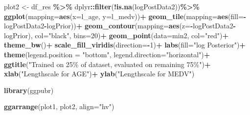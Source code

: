 \documentclass[
]{article}
\newenvironment{Shaded}{\begin{snugshade}}{\end{snugshade}}
\newcommand{\AttributeTok}[1]{\textcolor[rgb]{0.13,0.29,0.53}{#1}}
\newcommand{\DecValTok}[1]{\textcolor[rgb]{0.00,0.00,0.81}{#1}}
\newcommand{\FunctionTok}[1]{\textcolor[rgb]{0.13,0.29,0.53}{\textbf{#1}}}
\newcommand{\NormalTok}[1]{#1}
\newcommand{\OtherTok}[1]{\textcolor[rgb]{0.56,0.35,0.01}{#1}}
\newcommand{\SpecialCharTok}[1]{\textcolor[rgb]{0.81,0.36,0.00}{\textbf{#1}}}
\newcommand{\StringTok}[1]{\textcolor[rgb]{0.31,0.60,0.02}{#1}}
\begin{document}
\begin{Shaded}
\begin{Highlighting}[]
\NormalTok{plot2 }\OtherTok{\textless{}{-}}\NormalTok{ df\_res }\SpecialCharTok{\%\textgreater{}\%}
\NormalTok{  dplyr}\SpecialCharTok{::}\FunctionTok{filter}\NormalTok{(}\SpecialCharTok{!}\FunctionTok{is.na}\NormalTok{(logPostData2))}\SpecialCharTok{\%\textgreater{}\%}
  \FunctionTok{ggplot}\NormalTok{(}\AttributeTok{mapping=}\FunctionTok{aes}\NormalTok{(}\AttributeTok{x=}\NormalTok{l\_age, }\AttributeTok{y=}\NormalTok{l\_medv))}\SpecialCharTok{+}
  \FunctionTok{geom\_tile}\NormalTok{(}\AttributeTok{mapping=}\FunctionTok{aes}\NormalTok{(}\AttributeTok{fill=}\SpecialCharTok{{-}}\NormalTok{logPostData2}\SpecialCharTok{{-}}\NormalTok{logPrior))}\SpecialCharTok{+}
  \FunctionTok{geom\_contour}\NormalTok{(}\AttributeTok{mapping=}\FunctionTok{aes}\NormalTok{(}\AttributeTok{z=}\SpecialCharTok{{-}}\NormalTok{logPostData2}\SpecialCharTok{{-}}\NormalTok{logPrior), }\AttributeTok{col=}\StringTok{"black"}\NormalTok{, }\AttributeTok{bins=}\DecValTok{20}\NormalTok{)}\SpecialCharTok{+}
  \FunctionTok{geom\_point}\NormalTok{(}\AttributeTok{data=}\NormalTok{min2, }\AttributeTok{col=}\StringTok{"red"}\NormalTok{)}\SpecialCharTok{+}
  \FunctionTok{theme\_bw}\NormalTok{()}\SpecialCharTok{+}
  \FunctionTok{scale\_fill\_viridis}\NormalTok{(}\AttributeTok{direction=}\SpecialCharTok{{-}}\DecValTok{1}\NormalTok{)}\SpecialCharTok{+}
  \FunctionTok{labs}\NormalTok{(}\AttributeTok{fill=}\StringTok{"log Posterior"}\NormalTok{)}\SpecialCharTok{+}
  \FunctionTok{theme}\NormalTok{(}\AttributeTok{legend.position =} \StringTok{"bottom"}\NormalTok{,}
        \AttributeTok{legend.direction=}\StringTok{"horizontal"}\NormalTok{)}\SpecialCharTok{+}
  \FunctionTok{ggtitle}\NormalTok{(}\StringTok{"Trained on 25\% of dataset, evaluated on remaining 75\%"}\NormalTok{)}\SpecialCharTok{+}
  \FunctionTok{xlab}\NormalTok{(}\StringTok{"Lengthscale for \textquotesingle{}AGE\textquotesingle{}"}\NormalTok{)}\SpecialCharTok{+}
  \FunctionTok{ylab}\NormalTok{(}\StringTok{"Lengthscale for \textquotesingle{}MEDV\textquotesingle{}"}\NormalTok{)}

\FunctionTok{library}\NormalTok{(ggpubr)}

\FunctionTok{ggarrange}\NormalTok{(plot1, plot2, }\AttributeTok{align=}\StringTok{"hv"}\NormalTok{)}
\end{Highlighting}
\end{Shaded}
\end{document}
